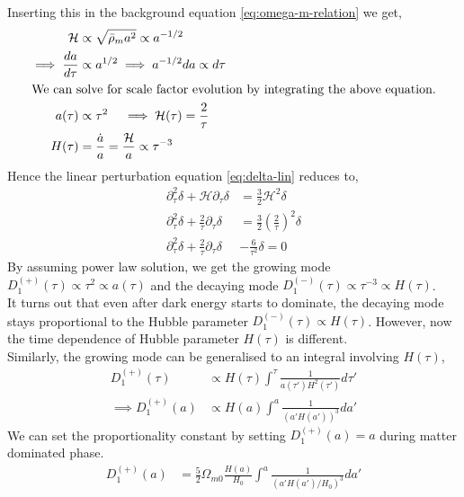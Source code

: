 \documentclass[12pt]{article}
\begin{document}
Inserting this in the background equation \eqref{eq:omega-m-relation} we get,
\begin{align}
\mathcal{H} &\propto \sqrt{\bar{\rho}_{m} a^2} \propto a^{-1/2}\\
\implies \frac{da}{d\tau} &\propto a^{1/2} \implies
a^{-1/2} da \propto d \tau\\
\intertext{We can solve for scale factor evolution by integrating the above equation.}
a(\tau) &\propto \tau^2 \quad \implies \mathcal{H}(\tau) = \frac{2}{\tau}\\
H(\tau) &= \frac{\dot{a}}{a} = \frac{\mathcal{H}}{a} \propto \tau^{-3}
\end{align}
Hence the linear perturbation equation \eqref{eq:delta-lin} reduces to,
\begin{align}
\partial_{\tau}^2 \delta + \mathcal{H} \partial_{\tau} \delta &= \frac{3}{2} \mathcal{H}^2 \delta\\
\partial_{\tau}^2 \delta + \frac{2}{\tau} \partial_{\tau} \delta &= \frac{3}{2} \left( \frac{2}{\tau} \right) ^2 \delta\\
\partial_{\tau}^2 \delta + \frac{2}{\tau} \partial_{\tau} \delta &- \frac{6}{\tau^2} \delta = 0
\end{align}
By assuming power law solution, we get the growing mode $D_1^{(+)}(\tau) \propto \tau^2 \propto a(\tau)$ and the decaying mode $D_1^{(-)}(\tau) \propto \tau^{-3} \propto  H(\tau)$.\\
It turns out that even after dark energy starts to dominate, the decaying mode stays proportional to the Hubble parameter $D_1^{(-)}(\tau) \propto H(\tau)$. However, now the time dependence of Hubble parameter $H(\tau)$ is different.  \\
Similarly, the growing mode can be generalised to an integral involving $H(\tau)$,
\begin{align}
D_1^{(+)}(\tau) &\propto H(\tau) \int^{\tau} \frac{1}{a(\tau') H^2(\tau')} d\tau'\\
\implies D_1^{(+)}(a) &\propto H(a) \int^{a} \frac{1}{(a'H(a'))^3} da'
\end{align}
We can set the proportionality constant by setting $D_1^{(+)}(a) = a$ during matter dominated phase.
\begin{align}
D_1^{(+)}(a) &= \frac{5}{2} \Omega_{m0} \frac{H(a)}{H_0} \int^{a} \frac{1}{(a'H(a')/H_0)^3} da'
\end{align}
\end{document}

